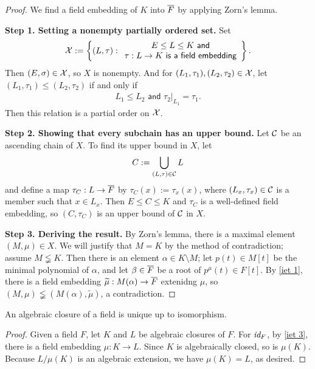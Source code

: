 \begin{proof}
    We find a field embedding of $K$ into $\overline{F}$ by applying Zorn's lemma.

    \textbf{Step 1. Setting a nonempty partially ordered set.}\newline\noindent
    Set
    \begin{align*}
        {\mathcal{X}}:=\left\{(L, \tau):
        \begin{array}{c}
            E\leq L\leq K\textsf{ and}\\
            \tau: L\rightarrow K\textsf{ is a field embedding}
        \end{array}
        \right\}.
    \end{align*}
    Then $(E, \sigma)\in {\mathcal{X}}$, so $X$ is nonempty.
    And for $(L_1, \tau_1), (L_2, \tau_2)\in {\mathcal{X}}$, let $(L_1, \tau_1)\leq(L_2, \tau_2)$ if and only if
    \begin{align*}
        L_1\leq L_2\textsf{ and } \tau_2|_{L_1}=\tau_1.
    \end{align*}
    \color{brown}Then this relation is a partial order on ${\mathcal{X}}$.\color{black}

    \textbf{Step 2. Showing that every subchain has an upper bound.}\newline\noindent
    Let ${\mathcal{C}}$ be an ascending chain of $X$.
    To find its upper bound in $X$, let
    \begin{align*}
        C:=\bigcup_{(L, \tau)\in {\mathcal{C}}} L
    \end{align*}
    and define a map $\tau_C: L\rightarrow \overline{F}$ by $\tau_C(x):=\tau_x(x)$, where $(L_x, \tau_x)\in{\mathcal{C}}$ is a member such that $x\in L_x$.
    \color{brown}Then $E\leq C\leq K$ and $\tau_C$ is a well-defined field embedding, \color{black}so $(C, \tau_C)$ is an upper bound of ${\mathcal{C}}$ in $X$.

    \textbf{Step 3. Deriving the result.}\newline\noindent
    By Zorn's lemma, there is a maximal element $(M, \mu)\in X$.
    We will justify that $M=K$ by the method of contradiction; assume $M\lneqq K$.
    Then there is an element $\alpha\in K\setminus M$; let $p(t)\in M[t]$ be the minimal polynomial of $\alpha$, and let $\beta\in \overline{F}$ be a root of $p^\mu(t)\in F[t]$.
    By \cref{iet 1}, there is a field embedding $\widetilde{\mu}: M(\alpha)\rightarrow\overline{F}$ extenidng $\mu$, so $(M, \mu)\lneqq(M(\alpha), \widetilde{\mu})$, a contradiction.
\end{proof}
\begin{cor}
    An algebraic closure of a field is unique up to isomorphism.
\end{cor}
\begin{proof}
    Given a field $F$, let $K$ and $L$ be algebraic closures of $F$.
    For $\textit{id}_{F}$, by \cref{iet 3}, there is a field embedding $\mu: K\rightarrow L$.
    Since $K$ is algebraically closed, so is $\mu(K)$.
    Because $L/\mu(K)$ is an algebraic extension, we have $\mu(K)=L$, as desired.
\end{proof}